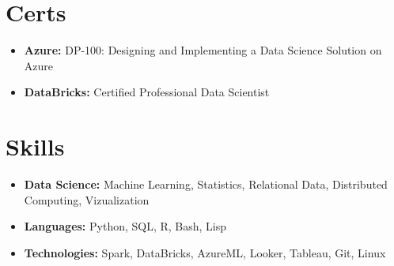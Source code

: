 \documentclass[letterpaper,11pt]{article}
\newcommand{\resumeItem}[1]{
  \item\small{
    \textbf{#1:}
  }
}
\newcommand{\resumeSubItem}[2]{\resumeItem{#1}{#2}\vspace{-4pt}}
\newcommand{\resumeSubHeadingListStart}{\begin{itemize}[leftmargin=*]}
\newcommand{\resumeSubHeadingListEnd}{\end{itemize}}
\begin{document}
\section{Certs}
  \resumeSubHeadingListStart
    \resumeSubItem{Azure}
      {DP-100: Designing and Implementing a Data Science Solution on Azure}
    \resumeSubItem{DataBricks}
      {Certified Professional Data Scientist}
  \resumeSubHeadingListEnd



\section{Skills}
  \resumeSubHeadingListStart
    \resumeSubItem{Data Science}
      {Machine Learning, Statistics, Relational Data, Distributed Computing, Vizualization}
    \resumeSubItem{Languages}
      {Python, SQL, R, Bash, Lisp}
    \resumeSubItem{Technologies}
      {Spark, DataBricks, AzureML, Looker, Tableau, Git, Linux}
  \resumeSubHeadingListEnd

\end{document}
